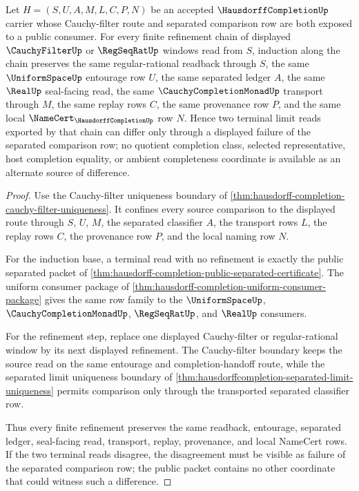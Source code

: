 \begin{theorem}
\label{thm:hausdorff-completion-separated-limit-induction}
Let $H=(S,U,A,M,L,C,P,N)$ be an accepted $\HausdorffCompletionUp$ carrier whose Cauchy-filter route and separated comparison row are both exposed to a public consumer. For every finite refinement chain of displayed $\CauchyFilterUp$ or $\RegSeqRatUp$ windows read from $S$, induction along the chain preserves the same regular-rational readback through $S$, the same $\UniformSpaceUp$ entourage row $U$, the same separated ledger $A$, the same $\RealUp$ seal-facing read, the same $\CauchyCompletionMonadUp$ transport through $M$, the same replay rows $C$, the same provenance row $P$, and the same local $\NameCert_{\HausdorffCompletionUp}$ row $N$. Hence two terminal limit reads exported by that chain can differ only through a displayed failure of the separated comparison row; no quotient completion class, selected representative, host completion equality, or ambient completeness coordinate is available as an alternate source of difference.
\end{theorem}
\begin{proof}
Use the Cauchy-filter uniqueness boundary of \autoref{thm:hausdorff-completion-cauchy-filter-uniqueness}. It confines every source comparison to the displayed route through $S$, $U$, $M$, the separated classifier $A$, the transport rows $L$, the replay rows $C$, the provenance row $P$, and the local naming row $N$.

For the induction base, a terminal read with no refinement is exactly the public separated packet of \autoref{thm:hausdorff-completion-public-separated-certificate}. The uniform consumer package of \autoref{thm:hausdorff-completion-uniform-consumer-package} gives the same row family to the $\UniformSpaceUp$, $\CauchyCompletionMonadUp$, $\RegSeqRatUp$, and $\RealUp$ consumers.

For the refinement step, replace one displayed Cauchy-filter or regular-rational window by its next displayed refinement. The Cauchy-filter boundary keeps the source read on the same entourage and completion-handoff route, while the separated limit uniqueness boundary of \autoref{thm:hausdorffcompletion-separated-limit-uniqueness} permits comparison only through the transported separated classifier row.

Thus every finite refinement preserves the same readback, entourage, separated ledger, seal-facing read, transport, replay, provenance, and local NameCert rows. If the two terminal reads disagree, the disagreement must be visible as failure of the separated comparison row; the public packet contains no other coordinate that could witness such a difference.
\end{proof}

